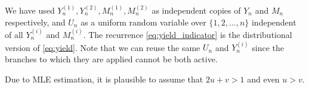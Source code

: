We have used $Y_n^{(1)}, Y_n^{(2)}, M_n^{(1)}, M_n^{(2)}$ as independent copies of $Y_n$ and $M_n$ respectively, and $U_n$ as a uniform random variable over $\{1, 2, \ldots, n\}$ independent of all $Y_n^{(i)}$ and $M_n^{(i)}$. The recurrence \eqref{eq:yield_indicator} is the distributional version of \eqref{eq:yield}. Note that we can reuse the same $U_n$ and $Y_n^{(i)}$ since the branches to which they are applied cannot be both active.

Due to MLE estimation, it is plausible to assume that $2u+v > 1$ and even $u > v$.